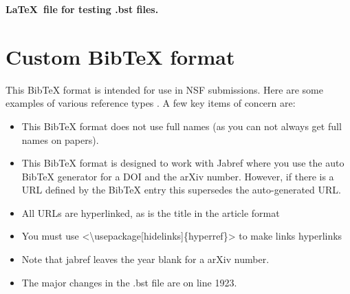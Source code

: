 \documentclass[11pt,letterpaper]{article}									%
\begin{document}
\begin{center}{\Large 
	\textbf{\LaTeX\ file for testing .bst files.}}
\end{center}

		
	\section*{Custom BibTeX format}		

	This BibTeX format is intended for use in NSF submissions. 	Here are some examples of various reference types \cite{test1,test2,test3,test4,test5,test6,test7,test8,test9,test10,test11}.	 A few key items of concern are:
	\begin{itemize}
		\item  This BibTeX format does not use full names (as you can not always get full names on papers).
		\item This BibTeX format is designed to work with Jabref where you use the auto BibTeX generator for a DOI and the arXiv number. However, if there is a URL defined by the BibTeX entry this supersedes the auto-generated URL.
		\item All URLs are hyperlinked, as is the title in the article format
		\item You must use <\textbackslash usepackage[hidelinks]\{hyperref\}> to make links hyperlinks
		\item Note that jabref leaves the year blank for a arXiv number. 
		\item The major changes in the .bst file are on line 1923.
	\end{itemize}
		
\pagestyle{empty}
	\FloatBarrier
	\renewcommand{\thepage}{}
	\renewcommand\refname{References Cited}
	
\end{document}
